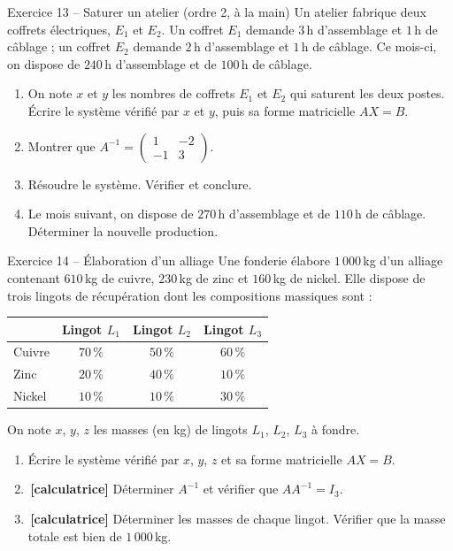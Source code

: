 \documentclass[a4paper,11pt]{article}
\newcommand{\M}[1]{\begin{pmatrix}#1\end{pmatrix}}
\newcommand{\calc}{\,{\color{uimmred}\small\textbf{[calculatrice]}}}
\begin{document}
\begin{exo}{Exercice 13 -- Saturer un atelier (ordre 2, à la main)}
\label{exo:13}
Un atelier fabrique deux coffrets électriques, $E_1$ et $E_2$. Un coffret $E_1$ demande $3$\,h d'assemblage et $1$\,h de câblage ; un coffret $E_2$ demande $2$\,h d'assemblage et $1$\,h de câblage. Ce mois-ci, on dispose de $240$\,h d'assemblage et de $100$\,h de câblage.
\begin{enumerate}[label=\alph*)]
  \item On note $x$ et $y$ les nombres de coffrets $E_1$ et $E_2$ qui saturent les deux postes. Écrire le système vérifié par $x$ et $y$, puis sa forme matricielle $AX = B$.
  \item Montrer que $A^{-1} = \M{1 & -2\\ -1 & 3}$.
  \item Résoudre le système. Vérifier et conclure.
  \item Le mois suivant, on dispose de $270$\,h d'assemblage et de $110$\,h de câblage. Déterminer la nouvelle production.
\end{enumerate}
\end{exo}

\begin{exo}{Exercice 14 -- Élaboration d'un alliage}
\label{exo:14}
Une fonderie élabore $1\,000$\,kg d'un alliage contenant $610$\,kg de cuivre, $230$\,kg de zinc et $160$\,kg de nickel. Elle dispose de trois lingots de récupération dont les compositions massiques sont :
\begin{center}
\renewcommand{\arraystretch}{1.3}
\begin{tabular}{|l|c|c|c|}
\hline
\rowcolor{uimmlightblue}
 & Lingot $L_1$ & Lingot $L_2$ & Lingot $L_3$ \\
\hline
Cuivre & $70\,\%$ & $50\,\%$ & $60\,\%$ \\
\hline
Zinc & $20\,\%$ & $40\,\%$ & $10\,\%$ \\
\hline
Nickel & $10\,\%$ & $10\,\%$ & $30\,\%$ \\
\hline
\end{tabular}
\end{center}
On note $x$, $y$, $z$ les masses (en kg) de lingots $L_1$, $L_2$, $L_3$ à fondre.
\begin{enumerate}[label=\alph*)]
  \item Écrire le système vérifié par $x$, $y$, $z$ et sa forme matricielle $AX = B$.
  \item \calc{} Déterminer $A^{-1}$ et vérifier que $AA^{-1} = I_3$.
  \item \calc{} Déterminer les masses de chaque lingot. Vérifier que la masse totale est bien de $1\,000$\,kg.
\end{enumerate}
\end{exo}
\end{document}
